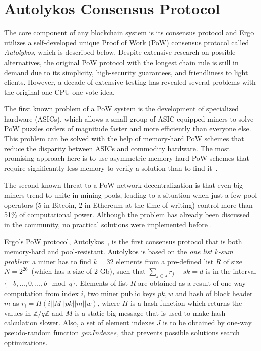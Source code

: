 \section{Autolykos Consensus Protocol}
\label{sec:autolykos}


The core component of any blockchain system is its consensus protocol and Ergo utilizes a self-developed
unique Proof of Work (PoW) consensus protocol called {\em Autolykos}, which is described below.
Despite extensive research on possible alternatives, the original PoW protocol with the longest chain rule is still in demand due to its simplicity, high-security guarantees, and friendliness to light clients.
However, a decade of extensive testing has revealed several problems with the original one-CPU-one-vote idea.

The first known problem of a PoW system is the development of specialized hardware (ASICs), which allows a small group of ASIC-equipped miners to solve PoW puzzles orders of magnitude faster and more efficiently than everyone else. This problem can be solved with the help of memory-hard PoW schemes that reduce the disparity between ASICs and commodity hardware. The most promising approach here is to use asymmetric memory-hard PoW schemes that require significantly less memory to verify a solution than to find it~\cite{biryukov2017equihash,ethHash}.

The second known threat to a PoW network decentralization is that even big miners trend to unite in
mining pools, leading to a situation when just a few pool operators (5 in Bitcoin, 2 in Ethereum
at the time of writing) control more than 51\% of computational power.
Although the problem has already been discussed in the community, no practical solutions were
implemented before \Ergo{}.


Ergo's PoW protocol, Autolykos~\cite{Ergopow}, is the first consensus protocol that is both memory-hard
and pool-resistant.
Autolykos is based on the {\em one list $k$-sum problem}: a miner has to find
$k=32$ elements from a pre-defined list $R$ of size $N=2^{26}$~(which has a size of 2 Gb),
such that $\sum_{j \in J} r_{j} - sk = d$ is in the interval $\{-b,\dots,0,\dots,b\mod q\}$.
Elements of list $R$ are obtained as a result of one-way computation from index $i$,
two miner public keys $pk,w$ and hash of block header $m$ as $r_i=H(i||M||pk||m||w)$,
where $H$ is a hash function which returns the values in $\mathbb{Z}/q\mathbb{Z}$ and
$M$ is a static big message that is used to make hash calculation slower.
Also, a set of element indexes $J$ is to be obtained
by one-way pseudo-random function $genIndexes$, that prevents possible solutions
search optimizations.

